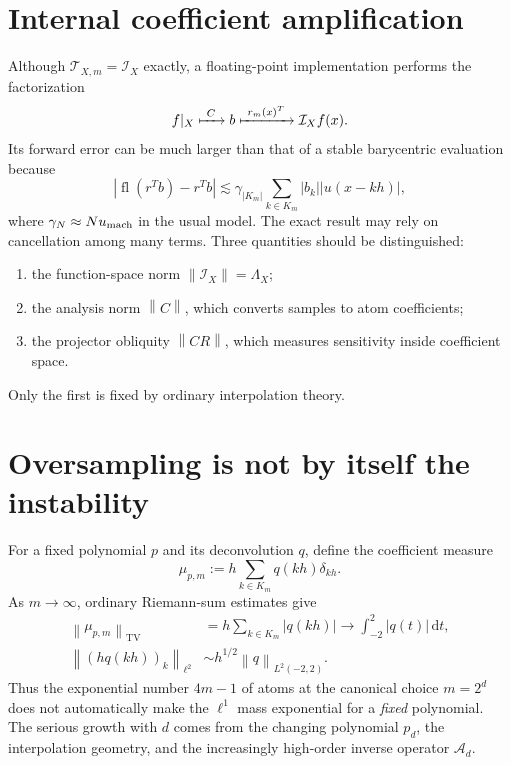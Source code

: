 \documentclass[11pt,oneside]{book}
\theoremstyle{definition}
\theoremstyle{remark}
\newcommand{\Iop}{\mathcal I}
\newcommand{\Aop}{\mathcal A}
\newcommand{\Top}{\mathcal T}
\newcommand{\dd}{\,\mathrm d}
\newcommand{\norm}[1]{\left\lVert#1\right\rVert}
\newcommand{\abs}[1]{\left\lvert#1\right\rvert}
\begin{document}
\section{Internal coefficient amplification}
Although \(\Top_{X,m}=\Iop_X\) exactly, a floating-point implementation performs the factorization
\begin{equation}
 f|_X\xmapsto{\ C\ }b\xmapsto{\ r_m(x)^T\ }\Iop_Xf(x).
 \label{eq:numerical-factorization}
\end{equation}
Its forward error can be much larger than that of a stable barycentric evaluation because
\begin{equation}
 \abs{\operatorname{fl}(r^Tb)-r^Tb}
 \lesssim \gamma_{|K_m|}\sum_{k\in K_m}\abs{b_k}\abs{u(x-kh)},
 \label{eq:dot-product-error}
\end{equation}
where \(\gamma_N\approx Nu_{\rm mach}\) in the usual model.  The exact result may rely on cancellation among many terms.  Three quantities should be distinguished:
\begin{enumerate}
\item the function-space norm \(\norm{\Iop_X}=\Lambda_X\);
\item the analysis norm \(\norm{C}\), which converts samples to atom coefficients;
\item the projector obliquity \(\norm{CR}\), which measures sensitivity inside coefficient space.
\end{enumerate}
Only the first is fixed by ordinary interpolation theory.

\section{Oversampling is not by itself the instability}
For a fixed polynomial \(p\) and its deconvolution \(q\), define the coefficient measure
\begin{equation}
 \mu_{p,m}:=h\sum_{k\in K_m}q(kh)\delta_{kh}.
 \label{eq:coefficient-measure}
\end{equation}
As \(m\to\infty\), ordinary Riemann-sum estimates give
\begin{align}
 \norm{\mu_{p,m}}_{\mathrm{TV}}
 &=h\sum_{k\in K_m}\abs{q(kh)}
 \longrightarrow\int_{-2}^{2}\abs{q(t)}\dd t,
 \label{eq:l1-limit}\\
 \norm{(h q(kh))_k}_{\ell^2}
 &\sim h^{1/2}\norm{q}_{L^2(-2,2)}.
 \label{eq:l2-limit}
\end{align}
Thus the exponential number \(4m-1\) of atoms at the canonical choice \(m=2^d\) does not automatically make the \(\ell^1\) mass exponential for a \emph{fixed} polynomial.  The serious growth with \(d\) comes from the changing polynomial \(p_d\), the interpolation geometry, and the increasingly high-order inverse operator \(\Aop_d\).
\end{document}
